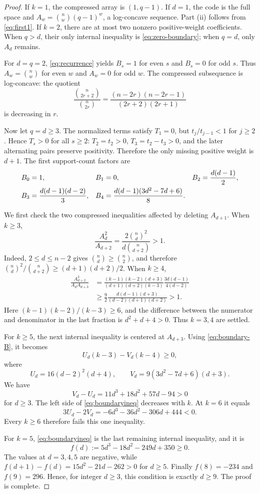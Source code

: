 \documentclass[11pt,letterpaper]{article}
\numberwithin{equation}{section}
\theoremstyle{definition}
\begin{document}
\begin{proof}
If $k=1$, the compressed array is $(1,q-1)$. If $d=1$, the code is
the full space and $A_w=\binom nw(q-1)^w$, a log-concave sequence.
Part (ii) follows from \eqref{eq:first1}. If $k=2$, there are at most
two nonzero positive-weight coefficients. When $q>d$, their only
internal inequality is \eqref{eq:zero-boundary}; when $q=d$, only
$A_d$ remains.

For $d=q=2$, \eqref{eq:recurrence} yields $B_s=1$ for even $s$ and
$B_s=0$ for odd $s$. Thus $A_w=\binom nw$ for even $w$ and $A_w=0$
for odd $w$. The compressed subsequence is log-concave: the quotient
\[
 \frac{\binom n{2r+2}}{\binom n{2r}}
 =\frac{(n-2r)(n-2r-1)}{(2r+2)(2r+1)}
\]
is decreasing in $r$.

Now let $q=d\ge3$. The normalized terms satisfy $T_1=0$, but
$t_j/t_{j-1}<1$ for $j\ge2$. Hence $T_s>0$ for all $s\ge2$:
$T_2=t_2>0$, $T_3=t_2-t_3>0$, and the later alternating pairs
preserve positivity. Therefore the only missing positive weight is
$d+1$. The first support-count factors are
\begin{align}
 B_0&=1,&B_1&=0,&B_2&=\frac{d(d-1)}2,\notag\\
 B_3&=\frac{d(d-1)(d-2)}3,&
 B_4&=\frac{d(d-1)(3d^2-7d+6)}8.
 \label{eq:boundary-B}
\end{align}

We first check the two compressed inequalities affected by deleting
$A_{d+1}$. When $k\ge3$,
\[
 \frac{A_d^2}{A_{d+2}}
 =\frac{2\binom nd^2}{d\binom n{d+2}}>1.
\]
Indeed, $2\le d\le n-2$ gives $\binom nd\ge\binom n2$, and therefore
$\binom nd^2/\binom n{d+2}\ge(d+1)(d+2)/2$.
When $k\ge4$,
\begin{align*}
 \frac{A_{d+2}^2}{A_dA_{d+3}}
 &=\frac{(k-1)(k-2)(d+3)}{(d+1)(d+2)(k-3)}
     \frac{3d(d-1)}{4(d-2)}\\
 &\ge\frac92\frac{d(d-1)(d+3)}{(d-2)(d+1)(d+2)}>1.
\end{align*}
Here $(k-1)(k-2)/(k-3)\ge6$, and the difference between the numerator
and denominator in the last fraction is $d^2+d+4>0$.
Thus $k=3,4$ are settled.

For $k\ge5$, the next internal inequality is centered at $A_{d+3}$.
Using \eqref{eq:boundary-B}, it becomes
\begin{equation}\label{eq:boundaryineq}
 U_d(k-3)-V_d(k-4)\ge0,
\end{equation}
where
\[
 U_d=16(d-2)^2(d+4),\qquad
 V_d=9(3d^2-7d+6)(d+3).
\]
We have
\[
 V_d-U_d=11d^3+18d^2+57d-94>0
\]
for $d\ge3$. The left side of \eqref{eq:boundaryineq} decreases
with $k$. At $k=6$ it equals
\[
 3U_d-2V_d=-6d^3-36d^2-306d+444<0.
\]
Every $k\ge6$ therefore fails this one inequality.

For $k=5$, \eqref{eq:boundaryineq} is the last remaining internal
inequality, and it is
\[
 f(d):=5d^3-18d^2-249d+350\ge0.
\]
The values at $d=3,4,5$ are negative, while
$f(d+1)-f(d)=15d^2-21d-262>0$ for $d\ge5$.
Finally $f(8)=-234$ and $f(9)=296$. Hence, for integer $d\ge3$,
this condition is exactly $d\ge9$. The proof is complete.
\end{proof}
\end{document}
